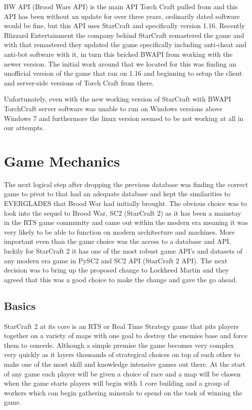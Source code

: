 \documentclass[a4paper,12pt]{report}
\begin{document}
BW API (Brood Wars API) is the main API Torch Craft pulled from and this API has been without an update for over three years, ordinarily dated software would be fine, but this API uses StarCraft and specifically version 1.16. Recently Blizzard Entertainment the company behind StarCraft remastered the game and with that remastered they updated the game specifically including anti-cheat and anti-bot software with it, in turn this bricked BWAPI from working with the newer version. The initial work around that we located for this was finding an unofficial version of the game that ran on 1.16 and beginning to setup the client and server-side versions of Torch Craft from there. 

Unfortunately, even with the new working version of StarCraft with BWAPI TorchCraft server software was unable to run on Windows versions above Windows 7 and furthermore the linux version seemed to be not working at all in our attempts.

\section{Game Mechanics}

The next logical step after dropping the previous database was finding the correct game to pivot to that had an adequate database and kept the similarities to EVERGLADES that Brood War had initially brought. The obvious choice was to look into the sequel to Brood War, SC2 (StarCraft 2) as it has been a mainstay in the RTS game community and came out within the modern era meaning it was very likely to be able to function on modern architecture and machines. More important even than the game choice was the access to a database and API, luckily for StarCraft 2 it has one of the most robust game API’s and datasets of any modern era game in PySC2 and SC2 API (StarCraft 2 API). The next decision was to bring up the proposed change to Lockheed Martin and they agreed that this was a good choice to make the change and gave the go ahead.

\subsection{Basics}

StarCraft 2 at its core is an RTS or Real Time Strategy game that pits players together on a variety of maps with one goal to destroy the enemies base and force them to concede. Although a simple premise the game becomes very complex very quickly as it layers thousands of strategical choices on top of each other to make one of the most skill and knowledge intensive games out there. At the start of any game each player will be given a choice of race and a map will be chosen when the game starts players will begin with 1 core building and a group of workers which can begin gathering minerals to spend on the task of winning the game.
\end{document}
